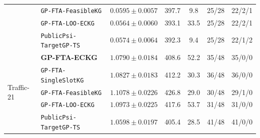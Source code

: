 \begin{table}[htbp]
\begin{tabular}{llccccc}
 & \texttt{GP-FTA-FeasibleKG} & $0.0595 \pm 0.0057$ & 397.7 & 9.8 & 25/28 & 22/2/1 \\
 & \texttt{GP-FTA-LOO-ECKG} & $\mathbf{0.0564} \pm 0.0060$ & 393.1 & 33.5 & 25/28 & 22/2/1 \\
 & \texttt{PublicPsi-TargetGP-TS} & $0.0574 \pm 0.0064$ & 392.3 & 9.4 & 25/28 & 22/1/2 \\
\midrule
\multirow{5}{*}{Traffic-21} & \textbf{GP-FTA-ECKG} & $1.0790 \pm 0.0184$ & 408.6 & 52.2 & 35/48 & 35/0/0 \\
 & \texttt{GP-FTA-SingleSlotKG} & $1.0827 \pm 0.0183$ & 412.2 & 30.3 & 36/48 & 36/0/0 \\
 & \texttt{GP-FTA-FeasibleKG} & $1.1078 \pm 0.0226$ & 426.8 & 29.0 & 30/48 & 29/1/0 \\
 & \texttt{GP-FTA-LOO-ECKG} & $1.0973 \pm 0.0225$ & 417.6 & 53.7 & 31/48 & 31/0/0 \\
 & \texttt{PublicPsi-TargetGP-TS} & $\mathbf{1.0598} \pm 0.0197$ & 405.4 & 28.5 & 41/48 & 41/0/0 \\
\bottomrule
\end{tabular}
\end{table}
